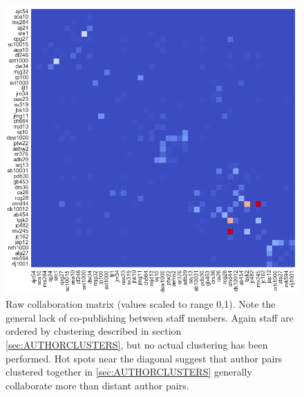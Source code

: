 \begin{figure}[H]
  \centering
  \label{fig:rawcollabs}
    \includegraphics[width=\textwidth]{Analysis/raw_collabs.png}
    \caption{Raw collaboration matrix (values scaled to range 0,1). Note the general lack of co-publishing between staff members. Again staff are ordered by clustering described in section \ref{sec:AUTHORCLUSTERS}, but no actual clustering has been performed. Hot spots near the diagonal suggest that author pairs clustered together in \ref{sec:AUTHORCLUSTERS} generally collaborate more than distant author pairs.  }
  \end{figure}
